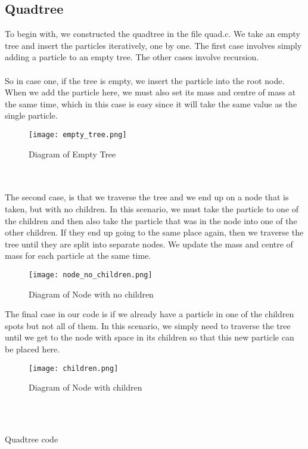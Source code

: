 \documentclass{article}
\begin{document}
\subsection{Quadtree}
To begin with, we constructed the quadtree in the file quad.c. We take an empty tree and insert the particles iteratively, one by one. The first case involves simply adding a particle to an empty tree. The other cases involve recursion. 
\\\\
So in case one, if the tree is empty, we insert the particle into the root node. When we add the particle here, we must also set its mass and centre of mass at the same time, which in this case is easy since it will take the same value as the single particle. 
\begin{figure}[htb]
\begin{center}
\texttt{[image: empty\_tree.png]}
\caption{Diagram of Empty Tree}
\end{center}
\end{figure}
\\\\
The second case, is that we traverse the tree and we end up on a node that is taken, but with no children. In this scenario, we must take the particle to one of the children and then also take the particle that was in the node into one of the other children. If they end up going to the same place again, then we traverse the tree until they are split into separate nodes. We update the mass and centre of mass for each particle at the same time. 
\begin{figure}[htb]
\begin{center}
\texttt{[image: node\_no\_children.png]}
\caption{Diagram of Node with no children}
\end{center}
\end{figure}
The final case in our code is if we already have a particle in one of the children spots but not all of them. In this scenario, we simply need to traverse the tree until we get to the node with space in its children so that this new particle can be placed here. 
\begin{figure}[htb]
\begin{center}
\texttt{[image: children.png]}
\caption{Diagram of Node with children}
\end{center}
\end{figure}
\\\\
\newpage
\begin{center}
    Quadtree code
\end{center}
\end{document}
